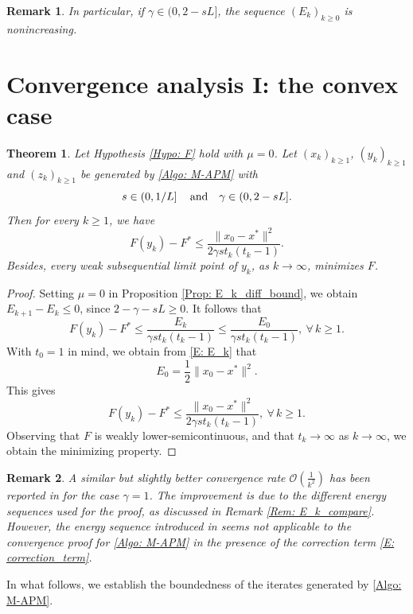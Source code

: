 \documentclass[pdflatex,sn-mathphys-num]{sn-jnl}
\theoremstyle{thmstyleone}
\newtheorem{theorem}{Theorem}
\theoremstyle{thmstyletwo}
\newtheorem{remark}{Remark}
\theoremstyle{thmstylethree}
\newcommand{\qbox}[1]{\quad\hbox{#1}\quad}
\begin{document}
\begin{remark}\label{Rem: E_k_decreasing}
In particular, if $\gamma\in(0,2-sL]$, the sequence $(E_k)_{k\ge 0}$ is nonincreasing.
\end{remark}




\section{Convergence analysis I: the convex case}\label{Sec: convex}
\begin{theorem}\label{Thm: convergence_cvx}
Let Hypothesis \ref{Hypo: F} hold with $\mu=0$. Let $(x_k)_{k\ge 1}$, $(y_k)_{k\ge 1}$ and $(z_k)_{k\ge 1}$ be generated by \eqref{Algo: M-APM} with 
$$s\in \left( 0, 1/L \right] \qbox{and} \gamma\in(0,2-sL].  $$
Then for every $k\ge 1$, we have
$$ F(y_k) - F^* \le \frac{\| x_0 - x^* \|^2}{2\gamma st_k(t_k-1)}. $$
Besides, every weak subsequential limit point of $y_k$, as $k\to\infty$, minimizes $F$.
\end{theorem}

\begin{proof}
Setting $\mu=0$ in Proposition \ref{Prop: E_k_diff_bound}, we obtain $E_{k+1}-E_k\le 0$, since $2-\gamma-sL\ge 0$. It follows that
$$ F(y_k) - F^* \le \frac{E_k}{\gamma st_k(t_k-1)} \le \frac{E_0}{\gamma st_k(t_k-1)},\ \forall\,k\ge 1. $$
With $t_0=1$ in mind, we obtain from \eqref{E: E_k} that
$$ E_0 = \frac{1}{2}\| x_0 - x^* \|^2. $$
This gives
$$ F(y_{k}) - F^* \le \frac{\| x_0 - x^* \|^2}{2\gamma st_k(t_k-1)},\ \forall\,k\ge 1. $$
Observing that $F$ is weakly lower-semicontinuous, and that $t_k\to\infty$ as $k\to\infty$, we obtain the minimizing property.
\end{proof}

\begin{remark}
A similar but slightly better convergence rate $\mathcal{O}\left( \frac{1}{k^2} \right)$ has been reported in \cite{Beck_2009_Monotone} for the case $\gamma=1$. The improvement is due to the different energy sequences used for the proof, as discussed in Remark \ref{Rem: E_k_compare}. However, the energy sequence introduced in \cite{Beck_2009_Monotone} seems not applicable to the convergence proof for \eqref{Algo: M-APM} in the presence of the correction term \eqref{E: correction_term}.
\end{remark}


In what follows, we establish the boundedness of the iterates generated by \eqref{Algo: M-APM}.
\end{document}
